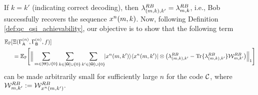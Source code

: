 If $k=k'$ (indicating correct decoding), then $\lambda_{(m,k),k'}^{R B} = \lambda_{m,k}^{R B}$, i.e., Bob successfully recovers the sequence $x^n(m,k)$.
Now, following Definition \ref{def:qc_qsi_achievability}, our objective is to show that the following term 
\begin{align*}
    \mathbb{E}_{\mathbb{P}}[&\Xi(\Gamma^{(n)}_{\mathsf{A}},\Gamma^{(n)}_{\mathsf{B}},f)] \\&= \mathbb{E}_{\mathbb{P}}\Bigg[ \Big\|\sum_{m \in [\Theta]\cup \{0\}}\sum_{\substack{k\in [\bar{\Theta}]\cup \{0\}}}\sum_{k'\in [\bar{\Theta}]\cup \{0\}} \!\!|x^n(m,k')\rangle\langle x^n(m,k')|\otimes \big(\lambda_{(m,k),k'}^{R B} -  \text{Tr}\{\lambda_{(m,k),k'}^{R B}\}\mathcal{W}_{m,k'}^{R B}\big)\Big\|_1\Bigg]
\end{align*}
can be made arbitrarily small for sufficiently large $n$ for the code $\mathcal{C}$, where $\mathcal{W}_{m,k'}^{R B}:= \mathcal{W}_{x^n(m,k')}^{R B}.$ 

